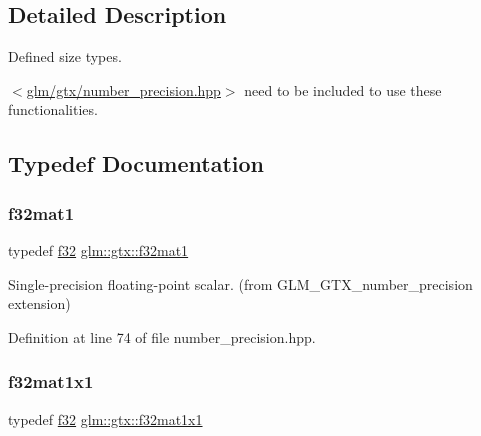 \subsection{Detailed Description}
Defined size types. 

$<$\hyperlink{number__precision_8hpp}{glm/gtx/number\+\_\+precision.\+hpp}$>$ need to be included to use these functionalities. 

\subsection{Typedef Documentation}
\mbox{\label{group__gtx__number__precision_gae5ff376ec910c360f06acc0c2b99260c}} 
\subsubsection{\texorpdfstring{f32mat1}{f32mat1}}
{\footnotesize\ttfamily typedef \hyperlink{group__gtc__type__precision_ga0ec999b57f5330d9021256e96038df04}{f32} \hyperlink{group__gtx__number__precision_gae5ff376ec910c360f06acc0c2b99260c}{glm\+::gtx\+::f32mat1}}



Single-\/precision floating-\/point scalar. (from G\+L\+M\+\_\+\+G\+T\+X\+\_\+number\+\_\+precision extension) 



Definition at line 74 of file number\+\_\+precision.\+hpp.

\mbox{\label{group__gtx__number__precision_ga01caec78388a82a9a22bd45e5751a38a}} 
\subsubsection{\texorpdfstring{f32mat1x1}{f32mat1x1}}
{\footnotesize\ttfamily typedef \hyperlink{group__gtc__type__precision_ga0ec999b57f5330d9021256e96038df04}{f32} \hyperlink{group__gtx__number__precision_ga01caec78388a82a9a22bd45e5751a38a}{glm\+::gtx\+::f32mat1x1}}



